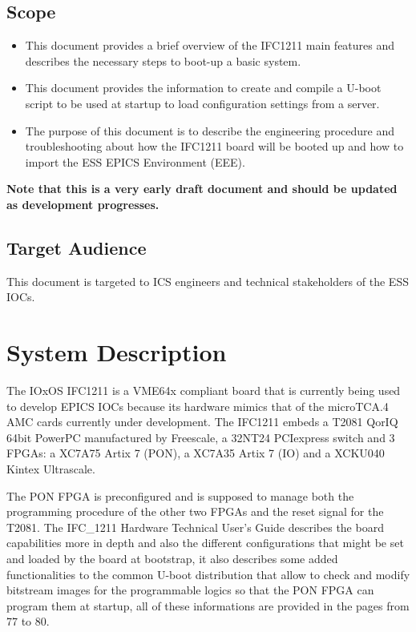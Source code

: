 \documentclass[11pt
  , a4paper
  , article
  , oneside
  , showtrims
]{memoir}
\begin{document}
\section{Scope}
\begin{itemize}
\item This document provides a brief overview of the IFC1211 main features and describes the necessary steps to boot-up a basic system.
\item This document provides the information to create and compile a U-boot script to be used at startup to load configuration settings from a server. 
\item The purpose of this document is to describe the engineering procedure and troubleshooting about how the IFC1211 board will be booted up and how to import the ESS EPICS Environment (EEE).

\end{itemize}
\textbf{Note that this is a very early draft document and should be updated as development progresses.}

\section{Target Audience}
This document is targeted to ICS engineers and technical stakeholders of the ESS IOCs. %

\chapter{System Description}
The IOxOS IFC1211 is a VME64x compliant board that is currently being used to develop EPICS IOCs because its hardware mimics that of the microTCA.4 AMC cards currently under development.
The IFC1211 embeds a T2081 QorIQ 64bit PowerPC manufactured by Freescale, a 32NT24 PCIexpress switch and 3 FPGAs: a XC7A75 Artix 7 (PON), a XC7A35 Artix 7 (IO) and a XCKU040 Kintex Ultrascale.

The PON FPGA is preconfigured and is supposed to manage both the programming procedure of the other two FPGAs and the reset signal for the T2081.
The IFC\_1211 Hardware Technical User's Guide \cite{IFC1211_HW_TUG} describes the board capabilities more in depth and also the different configurations that might be set and loaded by the board at bootstrap, it also describes some added functionalities to the common U-boot distribution that allow to check and modify bitstream images for the programmable logics so that the PON FPGA can program them at startup, all of these informations are provided in the pages from 77 to 80.
\end{document}
